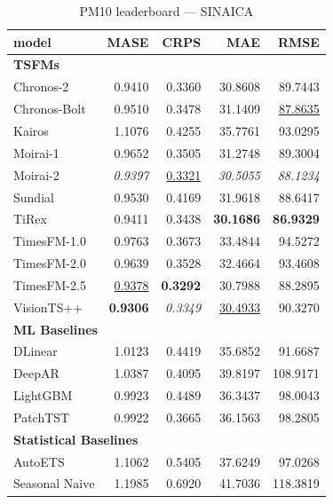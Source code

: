 \begin{table}[H]
\caption{PM10 leaderboard --- SINAICA}
\centering
\begin{small}
\begin{tabular}{lrrrr}
\toprule
model & MASE & CRPS & MAE & RMSE \\
\midrule
\multicolumn{5}{l}{\textbf{TSFMs}} \\
Chronos-2 & 0.9410 & 0.3360 & 30.8608 & 89.7443 \\
Chronos-Bolt & 0.9510 & 0.3478 & 31.1409 & \underline{87.8635} \\
Kairos & 1.1076 & 0.4255 & 35.7761 & 93.0295 \\
Moirai-1 & 0.9652 & 0.3505 & 31.2748 & 89.3004 \\
Moirai-2 & \textit{0.9397} & \underline{0.3321} & \textit{30.5055} & \textit{88.1234} \\
Sundial & 0.9530 & 0.4169 & 31.9618 & 88.6417 \\
TiRex & 0.9411 & 0.3438 & \textbf{30.1686} & \textbf{86.9329} \\
TimesFM-1.0 & 0.9763 & 0.3673 & 33.4844 & 94.5272 \\
TimesFM-2.0 & 0.9639 & 0.3528 & 32.4664 & 93.4608 \\
TimesFM-2.5 & \underline{0.9378} & \textbf{0.3292} & 30.7988 & 88.2895 \\
VisionTS++ & \textbf{0.9306} & \textit{0.3349} & \underline{30.4933} & 90.3270 \\
\midrule
\multicolumn{5}{l}{\textbf{ML Baselines}} \\
DLinear & 1.0123 & 0.4419 & 35.6852 & 91.6687 \\
DeepAR & 1.0387 & 0.4095 & 39.8197 & 108.9171 \\
LightGBM & 0.9923 & 0.4489 & 36.3437 & 98.0043 \\
PatchTST & 0.9922 & 0.3665 & 36.1563 & 98.2805 \\
\midrule
\multicolumn{5}{l}{\textbf{Statistical Baselines}} \\
AutoETS & 1.1062 & 0.5405 & 37.6249 & 97.0268 \\
Seasonal Naive & 1.1985 & 0.6920 & 41.7036 & 118.3819 \\
\bottomrule
\end{tabular}
\end{small}
\end{table}
